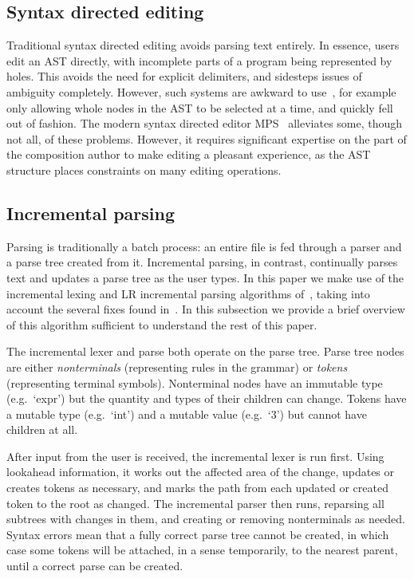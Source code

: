 \documentclass[sigplan,screen]{acmart}\settopmatter{printfolios=true,printccs=false,printacmref=false}
\begin{document}
\subsection{Syntax directed editing}

Traditional syntax directed editing avoids parsing text entirely. In essence,
users edit an AST directly, with incomplete parts of a program being
represented by holes. This avoids the need for explicit delimiters, and
sidesteps issues of ambiguity completely. However, such systems are awkward to
use~\cite[p.~2]{khwaja93syntax}, for example only allowing whole nodes in the AST to be selected at a time,
and quickly fell out of fashion. The modern syntax directed editor
MPS~\cite{pech13mps} alleviates some, though not all, of these problems.
However, it requires significant expertise on the part of the composition
author to make editing a pleasant experience, as the AST structure places
constraints on many editing operations.


\subsection{Incremental parsing}

Parsing is traditionally a batch process: an entire file is fed through a parser
and a parse tree created from it. Incremental parsing, in contrast,
continually parses text and updates a parse tree as the user types.
In this paper we make use of the incremental lexing and
LR incremental parsing algorithms of~\citet{wagner98practicalalgorithms},
taking into account the several fixes found in~\cite{diekmann18editing}.
In this subsection we provide a brief overview of this algorithm sufficient
to understand the rest of this paper.

The incremental lexer and parse both operate on the parse tree. Parse tree nodes
are either \emph{nonterminals} (representing rules in the grammar) or
\emph{tokens} (representing terminal symbols). Nonterminal nodes have an
immutable type (e.g.~`expr') but the quantity and types of their children can change.
Tokens have a mutable type (e.g.~`int')
and a mutable value (e.g.~`3') but cannot have children at all.

After input from the user is received, the incremental lexer is run first.
Using lookahead information, it works out the affected area of the change,
updates or creates tokens as necessary, and marks the path from each updated or
created token to the root as changed. The incremental parser then runs,
reparsing all subtrees with changes in them, and creating or removing
nonterminals as needed. Syntax errors mean that a fully correct parse tree
cannot be created, in which case some tokens will be attached, in a sense
temporarily, to the nearest parent, until a correct parse can be created.
\end{document}
